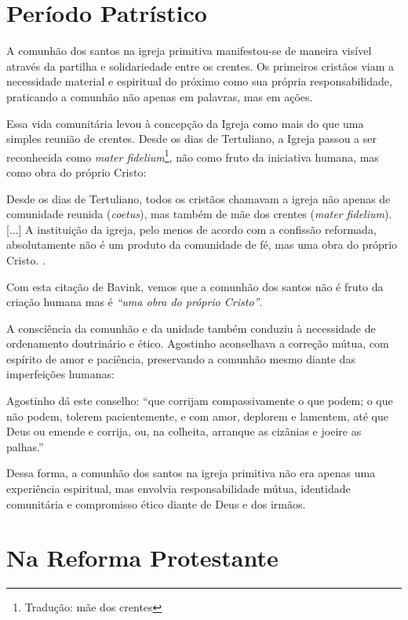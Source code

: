 \section{Período Patrístico}

A comunhão dos santos na igreja primitiva manifestou-se de maneira visível através da partilha e solidariedade entre os crentes. Os primeiros cristãos viam a necessidade material e espiritual do próximo como sua própria responsabilidade, praticando a comunhão não apenas em palavras, mas em ações.

Essa vida comunitária levou à concepção da Igreja como mais do que uma simples reunião de crentes. Desde os dias de Tertuliano, a Igreja passou a ser reconhecida como \textit{mater fidelium}\footnote{Tradução: mãe dos crentes}, não como fruto da iniciativa humana, mas como obra do próprio Cristo:
\begin{citacao}
Desde os dias de Tertuliano, todos os cristãos chamavam a igreja não apenas de comunidade reunida (\textit{coetus}), mas também de mãe dos crentes (\textit{mater fidelium}). [...] A instituição da igreja, pelo menos de acordo com a confissão reformada, absolutamente não é um produto da comunidade de fé, mas uma obra do próprio Cristo. \cite[335]{bavinck2012}.
\end{citacao}

Com esta citação de Bavink, vemos que a comunhão dos santos não é fruto da criação humana mas é \textit{``uma obra do próprio Cristo''}.

A consciência da comunhão e da unidade também conduziu à necessidade de ordenamento doutrinário e ético. Agostinho aconselhava a correção mútua, com espírito de amor e paciência, preservando a comunhão mesmo diante das imperfeições humanas:
\begin{citacao}
Agostinho dá este conselho: ``que corrijam compassivamente o que podem; o que não podem, tolerem pacientemente, e com amor, deplorem e lamentem, até que Deus ou emende e corrija, ou, na colheita, arranque as cizânias e joeire as palhas.'' \cite[v. 4, p. 102]{calvino2022}
\end{citacao}

Dessa forma, a comunhão dos santos na igreja primitiva não era apenas uma experiência espiritual, mas envolvia responsabilidade mútua, identidade comunitária e compromisso ético diante de Deus e dos irmãos.

\section{Na Reforma Protestante}

